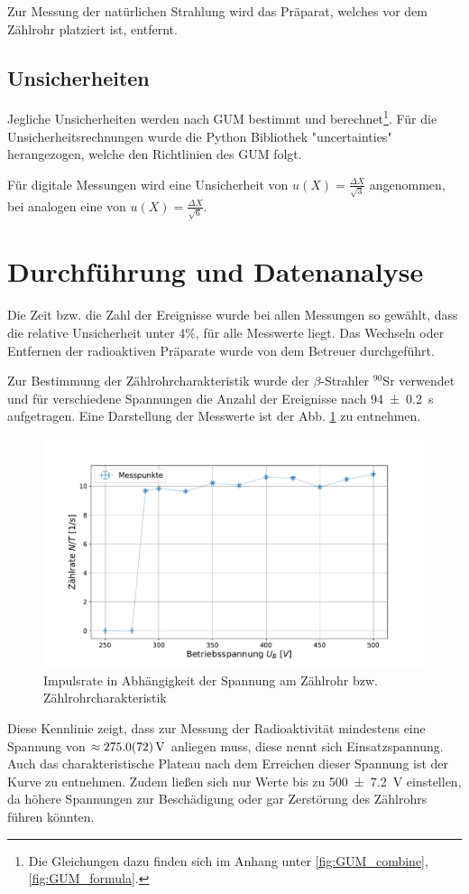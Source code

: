 		Zur Messung der natürlichen Strahlung wird das Präparat, welches vor dem Zählrohr platziert ist, entfernt.
				
	\subsection{Unsicherheiten}
	
		Jegliche Unsicherheiten werden nach GUM bestimmt und berechnet\footnote{Die Gleichungen dazu finden sich im Anhang unter \ref{fig:GUM_combine}, \ref{fig:GUM_formula}.}.
		Für die Unsicherheitsrechnungen wurde die Python Bibliothek "uncertainties" herangezogen, welche den Richtlinien des GUM folgt.
	
		Für digitale Messungen wird eine Unsicherheit von $u(X) = \frac{\Delta X}{\sqrt{3}}$ angenommen, bei analogen eine von $u(X) = \frac{\Delta X}{\sqrt{6}}$.

\section{Durchführung und Datenanalyse}
		
	Die Zeit bzw. die Zahl der Ereignisse wurde bei allen Messungen so gewählt, dass die relative Unsicherheit unter 4\%, für alle Messwerte liegt.
	Das Wechseln oder Entfernen der radioaktiven Präparate wurde von dem Betreuer durchgeführt.
	
	Zur Bestimmung der Zählrohrcharakteristik wurde der $\beta$-Strahler $^{90}$Sr verwendet und für verschiedene Spannungen die Anzahl der Ereignisse nach \SI{94+-0,2}{\second} aufgetragen. 
	Eine Darstellung der Messwerte ist der Abb. \ref{fig:Kennlinie} zu entnehmen.
	\begin{figure}[ht]
		\centering
		\includegraphics[width=\textwidth]{data/CharakteristikZaehlrohr.pdf}
		\caption{Impulsrate in Abhängigkeit der Spannung am Zählrohr bzw. Zählrohrcharakteristik}
		\label{fig:Kennlinie}	
	\end{figure}
	Diese Kennlinie zeigt, dass zur Messung der Radioaktivität mindestens eine Spannung von $\approx \SI{275+-7,2}{\volt}$ anliegen muss, diese nennt sich Einsatzspannung. 
	Auch das charakteristische Plateau nach dem Erreichen dieser Spannung ist der Kurve zu entnehmen.
	Zudem ließen sich nur Werte bis zu \SI{500+-7,2}{\volt} einstellen, da höhere Spannungen zur Beschädigung oder gar Zerstörung des Zählrohrs führen könnten. 
	
